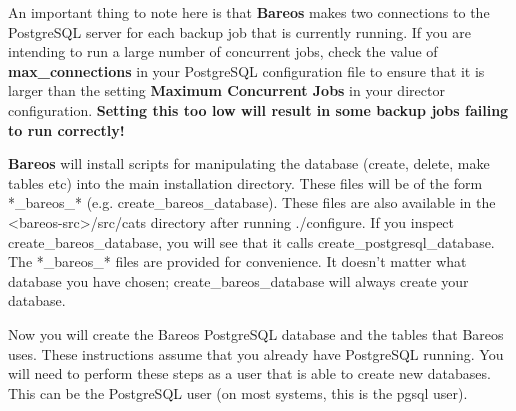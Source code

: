 An important thing to note here is that {\bf Bareos} makes two connections
to the PostgreSQL server for each backup job that is currently running.  If
you are intending to run a large number of concurrent jobs, check the value
of {\bf max\_connections} in your PostgreSQL configuration file to ensure
that it is larger than the setting {\bf Maximum Concurrent Jobs}
in your director configuration.  {\bf Setting this too low will result in
some backup jobs failing to run correctly!}

{\bf Bareos} will install scripts for manipulating the database (create,
delete, make tables etc) into the main installation directory. These files
will be of the form *\_bareos\_* (e.g. create\_bareos\_database). These files
are also available in the {\textless}bareos-src{\textgreater}/src/cats directory after
running ./configure. If you inspect create\_bareos\_database, you will see
that it calls create\_postgresql\_database. The *\_bareos\_* files are
provided for convenience. It doesn't matter what database you have chosen;
create\_bareos\_database will always create your database.

Now you will create the Bareos PostgreSQL database and the tables that Bareos
uses. These instructions assume that you already have PostgreSQL running. You
will need to perform these steps as a user that is able to create new
databases. This can be the PostgreSQL user (on most systems, this is the pgsql
user).


